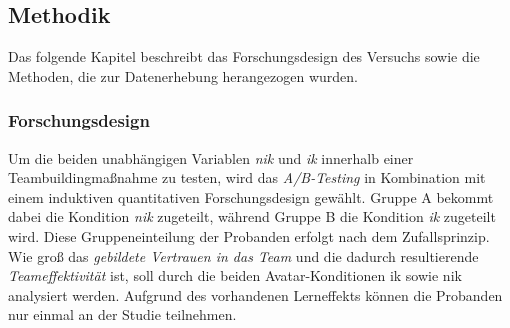 \documentclass[a4paper,11pt]{article}%
\renewcommand{\\}{\vspace*{0.5\baselineskip} \newline}
\begin{document}
{\subsection{Methodik}	
Das folgende Kapitel beschreibt das Forschungsdesign des Versuchs sowie die Methoden, die zur Datenerhebung herangezogen wurden.
\subsubsection{Forschungsdesign}

Um die beiden unabhängigen Variablen \textit{\ac{nik}} und \textit{\ac{ik}} innerhalb einer Teambuildingmaßnahme zu testen, wird das \textit{A/B-Testing} in Kombination mit einem induktiven quantitativen Forschungsdesign gewählt.
Gruppe A bekommt dabei die Kondition \newline \textit{\ac{nik}} zugeteilt, während Gruppe B die Kondition \textit{\ac{ik}} zugeteilt wird. Diese Gruppeneinteilung der Probanden erfolgt nach dem Zufallsprinzip. 
Wie groß das \textit{gebildete Vertrauen in das Team} und die dadurch resultierende \textit{Teameffektivität} ist, soll durch die beiden Avatar-Konditionen \ac{ik} sowie \ac{nik} analysiert werden. Aufgrund des vorhandenen Lerneffekts können die Probanden nur einmal an der Studie teilnehmen.


}
\end{document}
